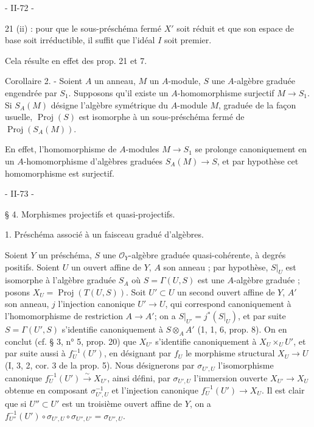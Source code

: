 \newpage


- II-72 -

21 (ii) : pour que le sous-préschéma fermé $X'$ soit réduit et que son espace de base soit irréductible, il suffit que l'idéal $I$ soit premier.

Cela résulte en effet des prop. 21 et 7.

Corollaire 2. - Soient $A$ un anneau, $M$ un $A$-module, $S$ une $A$-algèbre graduée engendrée par $S_1$. Supposons qu'il existe un $A$-homomorphisme surjectif $M \to S_1$. Si $S_A(M)$ désigne l'algèbre symétrique du $A$-module $M$, graduée de la façon usuelle, $\operatorname{Proj}(S)$ est isomorphe à un sous-préschéma fermé de $\operatorname{Proj}(S_A(M))$.

En effet, l'homomorphisme de $A$-modules $M \to S_1$ se prolonge canoniquement en un $A$-homomorphisme d'algèbres graduées $S_A(M) \to S$, et par hypothèse cet homomorphisme est surjectif.

\newpage



- II-73 -

§ 4. Morphismes projectifs et quasi-projectifs.

1. Préschéma associé à un faisceau gradué d'algèbres.

Soient $Y$ un préschéma, $S$ une $\mathcal{O}_Y$-algèbre graduée quasi-cohérente, à degrés positifs. Soient $U$ un ouvert affine de $Y$, $A$ son anneau ; par hypothèse, $S|_U$ est isomorphe à l'algèbre graduée $S_A$ où $S = \Gamma(U, S)$ est une $A$-algèbre graduée ; posons $X_U = \operatorname{Proj}(T(U, S))$. Soit $U' \subset U$ un second ouvert affine de $Y$, $A'$ son anneau, $j$ l'injection canonique $U' \to U$, qui correspond canoniquement à l'homomorphisme de restriction $A \to A'$; on a $S|_{U'} = j^*(S|_U)$, et par suite $S = \Gamma(U', S)$ s'identifie canoniquement à $S \otimes_A A'$ (1, 1, 6, prop. 8). On en conclut (cf. § 3, n° 5, prop. 20) que $X_{U'}$ s'identifie canoniquement à $X_U \times_U U'$, et par suite aussi à $f_U^{-1}(U')$, en désignant par $f_U$ le morphisme structural $X_U \to U$ (I, 3, 2, cor. 3 de la prop. 5). Nous désignerons par $\sigma_{U', U}$ l'isomorphisme canonique $f_U^{-1}(U') \xrightarrow{\sim} X_{U'}$, ainsi défini, par $\sigma_{U', U}$ l'immersion ouverte $X_{U'} \to X_U$ obtenue en composant $\sigma_{U', U}^{-1}$ et l'injection canonique $f_U^{-1}(U') \to X_U$.
Il est clair que si $U'' \subset U'$ est un troisième ouvert affine de $Y$, on a $f_{U''}^{-1}(U') \circ \sigma_{U', U} \circ \sigma_{U'', U'} = \sigma_{U'', U}$.

